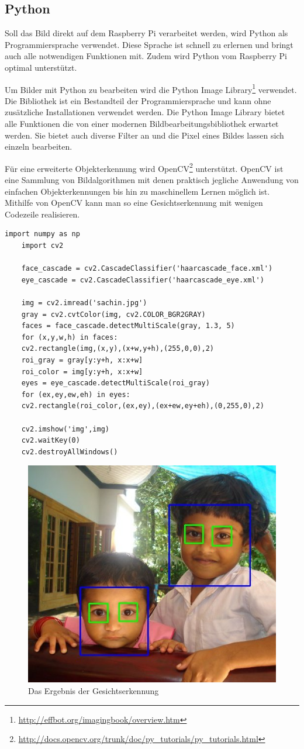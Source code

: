 \subsection{Python}

Soll das Bild direkt auf dem Raspberry Pi verarbeitet werden, wird Python als Programmiersprache verwendet. Diese Sprache ist schnell zu erlernen und bringt auch alle notwendigen Funktionen mit. Zudem wird Python vom Raspberry Pi optimal unterstützt.

Um Bilder mit Python zu bearbeiten wird die Python Image Library\footnote{\href{http://effbot.org/imagingbook/overview.htm}{http://effbot.org/imagingbook/overview.htm}} verwendet. Die Bibliothek ist ein Bestandteil der Programmiersprache und kann ohne zusätzliche Installationen verwendet werden. Die Python Image Library bietet alle Funktionen die von einer modernen Bildbearbeitungsbibliothek erwartet werden. Sie bietet auch diverse Filter an und die Pixel eines Bildes lassen sich einzeln bearbeiten. 

Für eine erweiterte Objekterkennung wird OpenCV\footnote{\href{http://docs.opencv.org/trunk/doc/py_tutorials/py_tutorials.html}{http://docs.opencv.org/trunk/doc/py\_tutorials/py\_tutorials.html}} unterstützt. OpenCV ist eine Sammlung von Bildalgorithmen mit denen praktisch jegliche Anwendung von einfachen Objekterkennungen bis hin zu maschinellem Lernen möglich ist. Mithilfe von OpenCV kann man so eine Gesichtserkennung mit wenigen Codezeile realisieren.

\begin{lstlisting}[caption={Gesichtserkennung mit OpenCV}]
	import numpy as np
	import cv2
	
	face_cascade = cv2.CascadeClassifier('haarcascade_face.xml')
	eye_cascade = cv2.CascadeClassifier('haarcascade_eye.xml')
	
	img = cv2.imread('sachin.jpg')
	gray = cv2.cvtColor(img, cv2.COLOR_BGR2GRAY)
	faces = face_cascade.detectMultiScale(gray, 1.3, 5)
	for (x,y,w,h) in faces:
	cv2.rectangle(img,(x,y),(x+w,y+h),(255,0,0),2)
	roi_gray = gray[y:y+h, x:x+w]
	roi_color = img[y:y+h, x:x+w]
	eyes = eye_cascade.detectMultiScale(roi_gray)
	for (ex,ey,ew,eh) in eyes:
	cv2.rectangle(roi_color,(ex,ey),(ex+ew,ey+eh),(0,255,0),2)
	
	cv2.imshow('img',img)
	cv2.waitKey(0)
	cv2.destroyAllWindows()
\end{lstlisting}

\begin{figure}[h!]
\centering
\includegraphics[width=0.7\linewidth]{../../fig/opencv_face}
\caption{Das Ergebnis der Gesichtserkennung}
\label{fig:opencv_face}
\end{figure}
